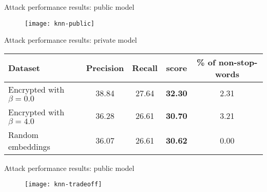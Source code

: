 	\begin{frame}{Attack performance results: public model}

		\begin{figure}[h]
			\centering
			\texttt{[image: knn-public]}
		\end{figure}

	\end{frame}

	\begin{frame}{Attack performance results: private model}

		\begin{table}[!ht]
			\begin{tabular*}{\linewidth}{ !{\extracolsep\fill} l c c >{\bfseries}c c } %
				\toprule
					Dataset							& Precision		& Recall	& \FOne{} score & \% of non-stop-words	\\
				\midrule
					Encrypted with $\beta = 0.0$	& 38.84			& 27.64		& 32.30			& 2.31					\\
					Encrypted with $\beta = 4.0$	& 36.28			& 26.61		& 30.70			& 3.21					\\
					Random embeddings				& 36.07			& 26.61		& 30.62			& 0.00					\\
				\bottomrule
			\end{tabular*}
		\end{table}

	\end{frame}

	\begin{frame}{Attack performance results: public model}

		\begin{figure}[h]
			\centering
			\texttt{[image: knn-tradeoff]}
		\end{figure}

	\end{frame}
